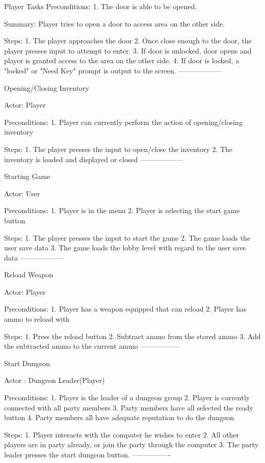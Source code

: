 \documentclass[12pt]{report}
\begin{document}
\begin {section}{Player Tasks}
Preconditions:
1. The door is able to be opened.

Summary: Player tries to open a door to access area on the other side. 

Steps:
1. The player approaches the door
2. Once close enough to the door, the player presses input to attempt to enter.
3. If door is unlocked, door opens and player is granted access to the area on the other side.
4. If door is locked, a "locked" or "Need Key" prompt is output to the screen.
------------------

Opening/Closing Inventory %

Actor: Player

Preconditions: 
1. Player can currently perform the action of opening/closing inventory

Steps:
1. The player presses the input to open/close the inventory
2. The inventory is loaded and displayed or closed 
------------------

Starting Game %

Actor: User

Preconditions: 
1. Player is in the menu
2. Player is selecting the start game button

Steps:
1. The player presses the input to start the game
2. The game loads the user save data
3. The game loads the lobby level with regard to the user save data
------------------

Reload Weapon %

Actor: Player

Preconditions: 
1. Player has a weapon equipped that can reload
2. Player has ammo to reload with

Steps:
1. Press the reload button
2. Subtract ammo from the stored ammo
3. Add the subtracted ammo to the current ammo
-----------------

Start Dungeon %

Actor : Dungeon Leader(Player)

Preconditions:
1. Player is the leader of a dungeon group
2. Player is currently connected with all party members
3. Party members have all selected the ready button
4. Party members all have adequate reputation to do the dungeon

Steps:
1. Player interacts with the computer he wishes to enter
2. All other players are in party already, or join the party through the computer
3. The party leader presses the start dungeon button.
----------------
\end{section}
\end{document}
